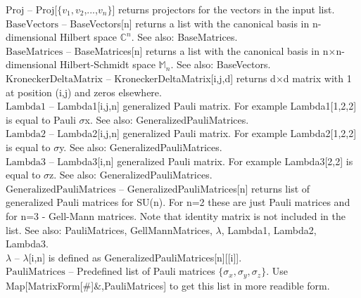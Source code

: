 \noindent\textbf{$ \text{Proj} $ }-- Proj[$\{$$ v_1,v_2 $,...,$ v_n $$\}$] returns projectors for the vectors in the input list.$  $\\[6pt]

\noindent\textbf{$ \text{BaseVectors} $ }-- BaseVectors[n] returns a list with the canonical basis in n-dimensional Hilbert space $ \mathbb{C}^n $. See also: BaseMatrices.$  $\\[6pt]

\noindent\textbf{$ \text{BaseMatrices} $ }-- BaseMatrices[n] returns a list with the canonical basis in n$\times $n-dimensional Hilbert-Schmidt space $ \mathbb{M}_n $. See also: BaseVectors.$  $\\[6pt]

\noindent\textbf{$ \text{KroneckerDeltaMatrix} $ }-- KroneckerDeltaMatrix[i,j,d] returns d$\times $d matrix with 1 at position (i,j) and zeros elsewhere.$  $\\[6pt]

\noindent\textbf{$ \text{Lambda1} $ }-- Lambda1[i,j,n] generalized Pauli matrix. For example Lambda1[1,2,2] is equal to Pauli $\sigma $x. See also: GeneralizedPauliMatrices.$  $\\[6pt]

\noindent\textbf{$ \text{Lambda2} $ }-- Lambda2[i,j,n] generalized Pauli matrix. For example Lambda2[1,2,2] is equal to $\sigma $y. See also: GeneralizedPauliMatrices.$  $\\[6pt]

\noindent\textbf{$ \text{Lambda3} $ }-- Lambda3[i,n] generalized Pauli matrix. For example Lambda3[2,2] is equal to $\sigma $z. See also: GeneralizedPauliMatrices.$  $\\[6pt]

\noindent\textbf{$ \text{GeneralizedPauliMatrices} $ }-- GeneralizedPauliMatrices[n] returns list of generalized Pauli matrices for SU(n). For n=2 these are just Pauli matrices and for n=3 - Gell-Mann matrices. Note that identity matrix is not included in the list. See also: PauliMatrices, GellMannMatrices, $\lambda $, Lambda1, Lambda2, Lambda3.$  $\\[6pt]

\noindent\textbf{$ \lambda  $ }-- $\lambda $[i,n] is defined as GeneralizedPauliMatrices[n][[i]].$  $\\[6pt]

\noindent\textbf{$ \text{PauliMatrices} $ }-- Predefined list of Pauli matrices $\{$$ \sigma _x,\sigma _y,\sigma _z $$\}$. Use Map[MatrixForm[$\#$]$\&$,PauliMatrices] to get this list in more readible form.$  $\\[6pt]

